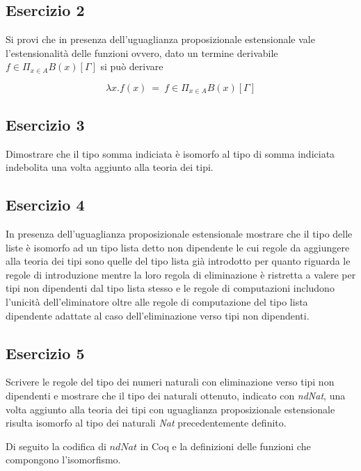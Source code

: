 \subsection{Esercizio 2}
\begin{thm}
	Si provi che in presenza dell’uguaglianza proposizionale estensionale vale l’estensionalità delle funzioni ovvero, dato un termine derivabile $f\in\Pi_{x\in A} B(x) [\Gamma]$ si può derivare
	
	\[ \lambda x.f(x)~=~f\in\Pi_{x\in A} B(x) [\Gamma] \]
\end{thm}


\subsection{Esercizio 3}
\begin{thm}
	Dimostrare che il tipo somma indiciata è isomorfo al tipo di somma indiciata indebolita una volta aggiunto alla teoria dei tipi.
\end{thm}


\subsection{Esercizio 4}
\begin{thm}
	In presenza dell’uguaglianza proposizionale estensionale mostrare che il tipo delle liste è isomorfo ad un tipo lista detto non dipendente le cui regole da aggiungere alla teoria dei tipi sono quelle del	tipo lista già introdotto per quanto riguarda le regole di introduzione mentre la loro regola di eliminazione è ristretta a valere per tipi non dipendenti dal tipo lista stesso e le regole di computazioni includono l’unicità dell’eliminatore oltre alle regole di computazione del tipo lista dipendente adattate al caso dell’eliminazione verso tipi non dipendenti.
\end{thm}


\subsection{Esercizio 5}
\begin{thm}
	Scrivere le regole del tipo dei numeri naturali con eliminazione verso tipi non dipendenti e mostrare che il tipo dei naturali ottenuto, indicato con \textit{ndNat}, una volta aggiunto alla teoria dei tipi con uguaglianza proposizionale estensionale risulta isomorfo al tipo dei naturali \textit{Nat} precedentemente definito.
\end{thm}

Di seguito la codifica di $ndNat$ in Coq e la definizioni delle funzioni che compongono l'isomorfismo.



